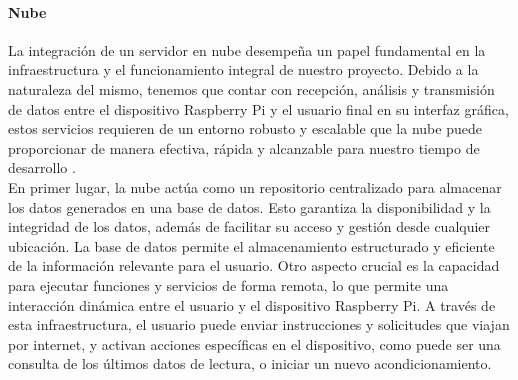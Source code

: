 \paragraph{Nube}
La integración de un servidor en nube desempeña un papel fundamental en la infraestructura y el funcionamiento integral de nuestro proyecto. Debido a la naturaleza del mismo, tenemos que contar con recepción, análisis y transmisión de datos entre el dispositivo Raspberry Pi y el usuario final en su interfaz gráfica, estos servicios requieren de un entorno robusto y escalable que la nube puede proporcionar de manera efectiva, rápida y alcanzable para nuestro tiempo de desarrollo \cite{AnoteOnIoT}. \\

En primer lugar, la nube actúa como un repositorio centralizado para almacenar los datos generados en una base de datos. Esto garantiza la disponibilidad y la integridad de los datos, además de facilitar su acceso y gestión desde cualquier ubicación. La base de datos permite el almacenamiento estructurado y eficiente de la información relevante para el usuario. Otro aspecto crucial es la capacidad para ejecutar funciones y servicios de forma remota, lo que permite una interacción dinámica entre el usuario y el dispositivo Raspberry Pi. A través de esta infraestructura, el usuario puede enviar instrucciones y solicitudes que viajan por internet, y activan acciones específicas en el dispositivo, como puede ser una consulta de los últimos datos de lectura, o iniciar un nuevo acondicionamiento. \\

